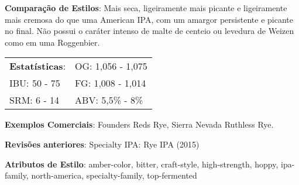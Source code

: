 \textbf{Comparação de Estilos}: Mais seca, ligeiramente mais picante e ligeiramente mais cremosa do que uma American IPA, com um amargor persistente e picante no final. Não possui o caráter intenso de malte de centeio ou levedura de Weizen como em uma Roggenbier.

\begin{tabular}{@{}p{35mm}p{35mm}@{}}
  \textbf{Estatísticas}: & OG: 1,056 - 1,075 \\
  IBU: 50 - 75  & FG: 1,008 - 1,014 \\
  SRM: 6 - 14  & ABV: 5,5\% - 8\%
\end{tabular}

\textbf{Exemplos Comerciais}: Founders Reds Rye, Sierra Nevada Ruthless Rye.

\textbf{Revisões anteriores}: Specialty IPA: Rye IPA (2015)

\textbf{Atributos de Estilo}: amber-color, bitter, craft-style, high-strength, hoppy, ipa-family, north-america, specialty-family, top-fermented
